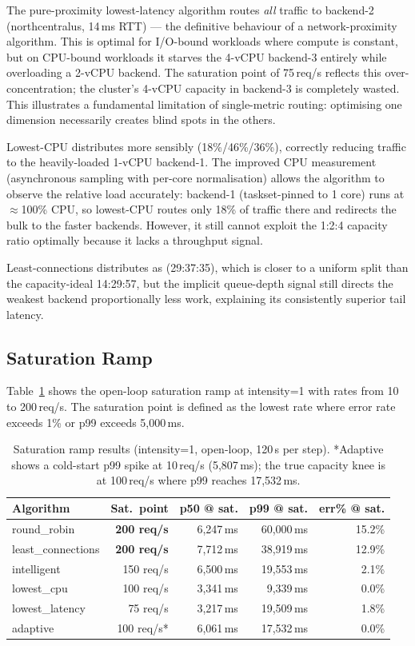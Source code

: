 \documentclass[12pt]{article}
\begin{document}
The pure-proximity lowest-latency algorithm routes \emph{all} traffic to
backend-2 (northcentralus, 14\,ms RTT) --- the definitive behaviour of a
network-proximity algorithm. This is optimal for I/O-bound workloads where
compute is constant, but on CPU-bound workloads it starves the 4-vCPU
backend-3 entirely while overloading a 2-vCPU backend. The saturation point
of 75\,req/s reflects this over-concentration; the cluster's 4-vCPU capacity
in backend-3 is completely wasted. This illustrates a fundamental limitation
of single-metric routing: optimising one dimension necessarily creates blind
spots in the others.

Lowest-CPU distributes more sensibly (18\%/46\%/36\%), correctly reducing
traffic to the heavily-loaded 1-vCPU backend-1. The improved CPU measurement
(asynchronous sampling with per-core normalisation) allows the algorithm to
observe the relative load accurately: backend-1 (taskset-pinned to 1 core)
runs at $\approx$100\% CPU, so lowest-CPU routes only 18\% of traffic there
and redirects the bulk to the faster backends. However, it still cannot exploit
the 1:2:4 capacity ratio optimally because it lacks a throughput signal.

Least-connections distributes as (29:37:35), which is closer to a uniform
split than the capacity-ideal 14:29:57, but the implicit queue-depth signal
still directs the weakest backend proportionally less work, explaining its
consistently superior tail latency.

\subsection{Saturation Ramp}

Table~\ref{tab:sat} shows the open-loop saturation ramp at intensity=1 with
rates from 10 to 200\,req/s. The saturation point is defined as the lowest
rate where error rate exceeds 1\% or p99 exceeds 5{,}000\,ms.

\begin{table}[H]
\centering
\small
\begin{tabular}{lrrrr}
\toprule
Algorithm & Sat.\ point & p50 @ sat. & p99 @ sat. & err\% @ sat. \\
\midrule
round\_robin       & \textbf{200 req/s} & 6{,}247\,ms & 60{,}000\,ms & 15.2\% \\
least\_connections & \textbf{200 req/s} & 7{,}712\,ms & 38{,}919\,ms & 12.9\% \\
intelligent        & 150 req/s & 6{,}500\,ms & 19{,}553\,ms &  2.1\% \\
lowest\_cpu        & 100 req/s & 3{,}341\,ms &  9{,}339\,ms &  0.0\% \\
lowest\_latency    &  75 req/s & 3{,}217\,ms & 19{,}509\,ms &  1.8\% \\
adaptive           & 100 req/s* & 6{,}061\,ms & 17{,}532\,ms &  0.0\% \\
\bottomrule
\end{tabular}
\caption{Saturation ramp results (intensity=1, open-loop, 120\,s per step).
*Adaptive shows a cold-start p99 spike at 10\,req/s (5{,}807\,ms); the true
capacity knee is at 100\,req/s where p99 reaches 17{,}532\,ms.}
\label{tab:sat}
\end{table}
\end{document}
